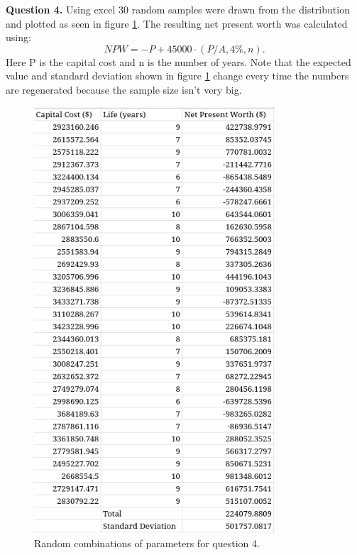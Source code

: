 \documentclass[letterpaper, reqno,11pt]{article}
\begin{document}
{\noindent\bf Question 4.} Using excel 30 random samples were drawn from the distribution and plotted as seen in figure \ref{fig:q4}. The resulting net present worth was calculated using: 
\[
NPW=-P+45000 \cdot (P /A, 4\%, n)
.\]
Here P is the capital cost and n is the number of years. Note that the expected value and standard deviation shown in figure \ref{fig:q4} change every time the numbers are regenerated because the sample size isn't very big. 

\begin{figure}[htpb]
    \centering
    \includegraphics[width=0.8\textwidth]{q4}
    \caption{Random combinations of parameters for question 4. }
    \label{fig:q4}
\end{figure}
\end{document}
